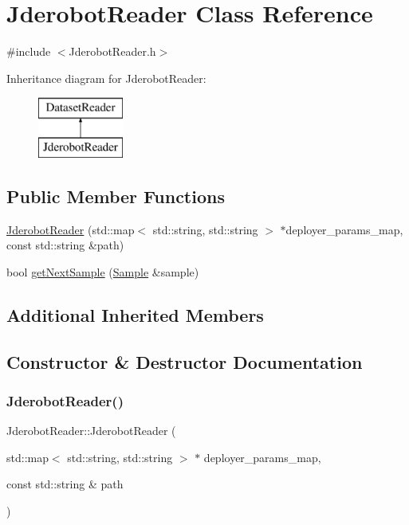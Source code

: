 \hypertarget{class_jderobot_reader}{}\section{Jderobot\+Reader Class Reference}
\label{class_jderobot_reader}


{\ttfamily \#include $<$Jderobot\+Reader.\+h$>$}

Inheritance diagram for Jderobot\+Reader\+:\begin{figure}[H]
\begin{center}
\leavevmode
\includegraphics[height=2.000000cm]{class_jderobot_reader}
\end{center}
\end{figure}
\subsection*{Public Member Functions}
\begin{DoxyCompactItemize}
\item 
\hyperlink{class_jderobot_reader_a89dde6b225b901d5b55926437be46d54}{Jderobot\+Reader} (std\+::map$<$ std\+::string, std\+::string $>$ $\ast$deployer\+\_\+params\+\_\+map, const std\+::string \&path)
\item 
bool \hyperlink{class_jderobot_reader_aef97b473c11e144fcf07e01c3181269b}{get\+Next\+Sample} (\hyperlink{struct_sample}{Sample} \&sample)
\end{DoxyCompactItemize}
\subsection*{Additional Inherited Members}


\subsection{Constructor \& Destructor Documentation}
\mbox{\label{class_jderobot_reader_a89dde6b225b901d5b55926437be46d54}} 
\subsubsection{\texorpdfstring{Jderobot\+Reader()}{JderobotReader()}}
{\footnotesize\ttfamily Jderobot\+Reader\+::\+Jderobot\+Reader (\begin{DoxyParamCaption}\item[{std\+::map$<$ std\+::string, std\+::string $>$ $\ast$}]{deployer\+\_\+params\+\_\+map,  }\item[{const std\+::string \&}]{path }\end{DoxyParamCaption})}



